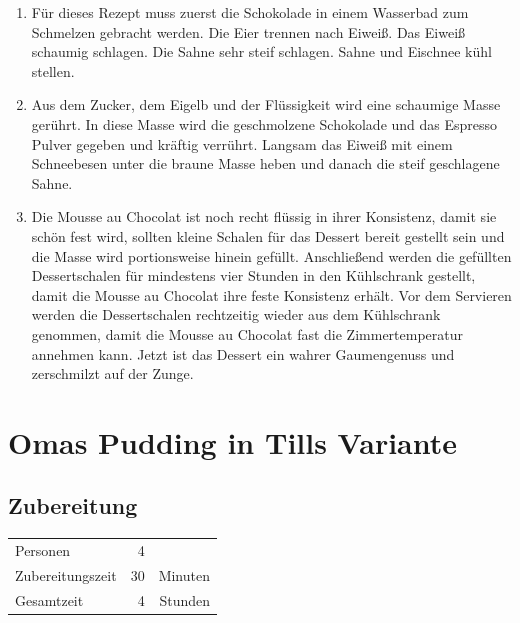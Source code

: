 \begin{enumerate}
	\item Für dieses Rezept muss zuerst die Schokolade in einem Wasserbad zum Schmelzen gebracht werden. Die Eier trennen nach Eiweiß. Das Eiweiß schaumig schlagen. Die Sahne sehr steif schlagen. Sahne und Eischnee kühl stellen.

	\item Aus dem Zucker, dem Eigelb und der Flüssigkeit wird eine schaumige Masse gerührt. In diese Masse wird die geschmolzene Schokolade und das Espresso Pulver gegeben und kräftig verrührt. Langsam das Eiweiß mit einem Schneebesen unter die braune Masse heben und danach die steif geschlagene Sahne.

	\item Die Mousse au Chocolat ist noch recht flüssig in ihrer Konsistenz, damit sie schön fest wird, sollten kleine Schalen für das Dessert bereit gestellt sein und die Masse wird portionsweise hinein gefüllt. Anschließend werden die gefüllten Dessertschalen für mindestens vier Stunden in den Kühlschrank gestellt, damit die Mousse au Chocolat ihre feste Konsistenz erhält. Vor dem Servieren werden die Dessertschalen rechtzeitig wieder aus dem Kühlschrank genommen, damit die Mousse au Chocolat fast die Zimmertemperatur annehmen kann. Jetzt ist das Dessert ein wahrer Gaumengenuss und zerschmilzt auf der Zunge. 
\end{enumerate}

\section{Omas Pudding in Tills Variante}


\subsection*{Zubereitung}
\begin{tabular}{lrr}
	Personen         &                        4 &  \\
	Zubereitungszeit &                       30 & Minuten \\
	Gesamtzeit       &                        4 & Stunden \\
\end{tabular} 

